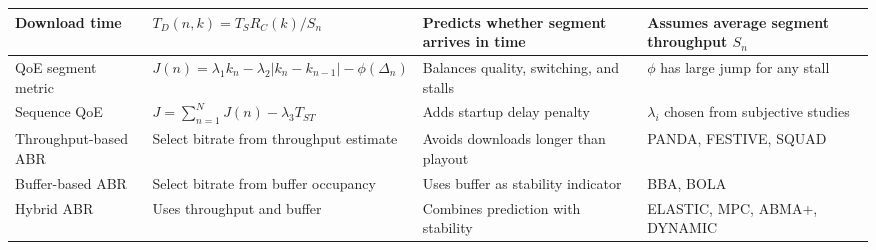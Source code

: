\begin{center}
\begin{tabular}{|l|l|l|l|}
Download time & $T_D(n,k)=T_S R_C(k)/S_n$ & Predicts whether segment arrives in time & Assumes average segment throughput $S_n$ \\ \hline
QoE segment metric & $J(n)=\lambda_1 k_n-\lambda_2|k_n-k_{n-1}|-\phi(\Delta_n)$ & Balances quality, switching, and stalls & $\phi$ has large jump for any stall \\ \hline
Sequence QoE & $J=\sum_{n=1}^{N}J(n)-\lambda_3T_{ST}$ & Adds startup delay penalty & $\lambda_i$ chosen from subjective studies \\ \hline
Throughput-based ABR & Select bitrate from throughput estimate & Avoids downloads longer than playout & PANDA, FESTIVE, SQUAD \\ \hline
Buffer-based ABR & Select bitrate from buffer occupancy & Uses buffer as stability indicator & BBA, BOLA \\ \hline
Hybrid ABR & Uses throughput and buffer & Combines prediction with stability & ELASTIC, MPC, ABMA+, DYNAMIC \\ \hline
\end{tabular}
\end{center}

